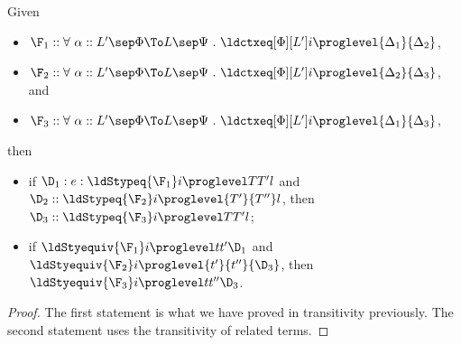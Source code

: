 \begin{lemma}[Transitivity]
  Given
  \begin{itemize}
  \item 
    $\F_1 :: \forall~\alpha :: L' \sep \Phi \To L \sep \Psi ~.~ \ldctxeq[\Phi][L'] i \proglevel
    {\Delta_1}{\Delta_2}$,
  \item $\F_2 :: \forall~\alpha :: L' \sep \Phi \To L \sep \Psi ~.~ \ldctxeq[\Phi][L'] i \proglevel
    {\Delta_2}{\Delta_3}$, and
  \item $\F_3 :: \forall~\alpha :: L' \sep \Phi \To L \sep \Psi ~.~ \ldctxeq[\Phi][L'] i \proglevel
    {\Delta_1}{\Delta_3}$,
  \end{itemize}
  then
  \begin{itemize}
  \item if $\D_1 :e: \ldStypeq{\F_1} i \proglevel T{T'} l$ and $\D_2 :: \ldStypeq{\F_2} i
    \proglevel{T'}{T''} l$, then 
    $\D_3 :: \ldStypeq{\F_3} i \proglevel T{T'} l$;
  \item if $\ldStyequiv{\F_1} i \proglevel t{t'}{\D_1}$ and $\ldStyequiv{\F_2} i \proglevel
    {t'}{t''}{\D_3}$, then $\ldStyequiv{\F_3} i \proglevel t{t''}{\D_3}$.
  \end{itemize}
\end{lemma}
\begin{proof}
  The first statement is what we have proved in transitivity previously. %
  The second statement uses the transitivity of related terms. %
\end{proof}





